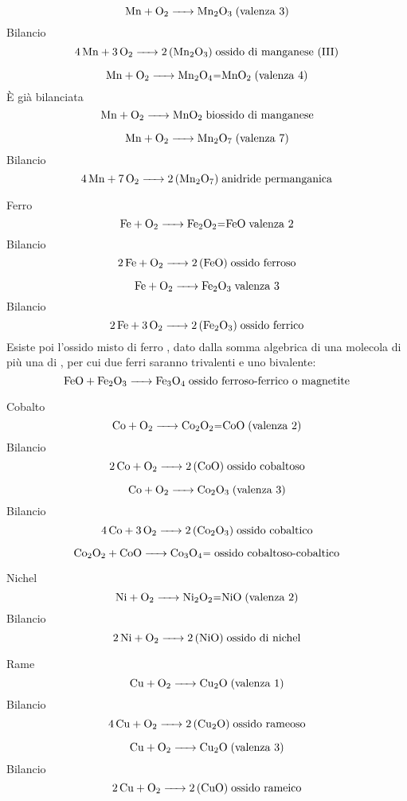 $$\ce{ Mn + O_2 -> Mn_2O_3} \; \text{(valenza 3)}$$ Bilancio
$$\ce{ 4 Mn + 3O_2 -> 2 (Mn_2O_3)} \; \text{ossido di manganese (III)}$$

$$\ce{ Mn + O_2 -> Mn_2O_4=MnO_2} \; \text{(valenza 4)}$$ È già bilanciata
$$\ce{ Mn + O_2 -> MnO_2} \; \text{biossido di manganese}$$ 

$$\ce{ Mn + O_2 -> Mn_2O_7} \; \text{(valenza 7)}$$ Bilancio
$$\ce{ 4 Mn + 7O_2 -> 2 (Mn_2O_7)} \; \text{anidride permanganica}$$

Ferro 
$$\ce{ Fe + O_2 -> Fe_2O_2=FeO} \; \text{valenza 2}$$ Bilancio
$$\ce{ 2 Fe + O_2 -> 2 (FeO)} \; \text{ossido ferroso}$$

$$\ce{ Fe + O_2 -> Fe_2O_3} \; \text{valenza 3}$$ Bilancio
$$\ce{ 2 Fe + 3O_2 -> 2 (Fe_2O_3)} \; \text{ossido ferrico}$$
Esiste poi l'ossido misto di ferro , dato dalla somma algebrica di una molecola di  più una di , per cui due ferri saranno trivalenti e uno bivalente:
$$\ce{FeO + Fe_2O_3 -> Fe_3O_4} \; \text{ossido ferroso-ferrico o magnetite}$$

Cobalto
$$\ce{ Co + O_2 -> Co_2O_2=CoO} \; \text{(valenza 2)}$$ Bilancio
$$\ce{ 2 Co + O_2 -> 2 (CoO)} \; \text{ossido cobaltoso}$$

$$\ce{ Co + O_2 -> Co_2O_3} \; \text{(valenza 3)}$$ Bilancio
$$\ce{ 4 Co + 3 O_2 -> 2 (Co_2O_3)} \; \text{ossido cobaltico}$$

$$\ce{ Co_2O_2 + CoO -> Co_3O_4=} \; \text{ossido cobaltoso-cobaltico}$$

Nichel
$$\ce{ Ni + O_2 -> Ni_2O_2=NiO} \; \text{(valenza 2)}$$ Bilancio
$$\ce{ 2 Ni + O_2 -> 2 (NiO)} \; \text{ossido di nichel}$$

Rame
$$\ce{ Cu + O_2 -> Cu_2O} \; \text{(valenza 1)}$$ Bilancio
$$\ce{ 4 Cu + O_2 -> 2 (Cu_2O)} \; \text{ossido rameoso}$$

$$\ce{ Cu + O_2 -> Cu_2O} \; \text{(valenza 3)}$$ Bilancio
$$\ce{ 2 Cu + O_2 -> 2 (CuO)} \; \text{ossido rameico}$$